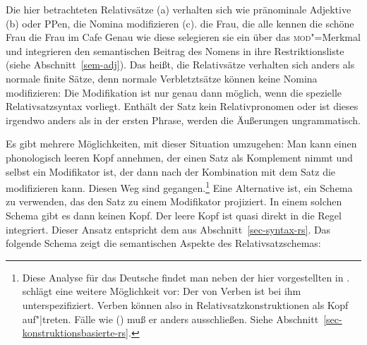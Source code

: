 Die hier betrachteten Relativsätze (a) verhalten sich wie pränominale
Adjektive (b) oder PPen, die Nomina modifizieren (c).
\eal
\ex die Frau, die alle kennen
\ex die schöne Frau
\ex die Frau im Cafe
\zl
Genau wie diese selegieren sie ein \nbar über das \textsc{mod}"=Merkmal und 
integrieren den semantischen Beitrag des Nomens in ihre Restriktionsliste (siehe Abschnitt~\ref{sem-adj}).
Das heißt, die Relativsätze verhalten sich anders als normale finite Sätze,
denn normale Verbletztsätze können keine Nomina modifizieren:
\eal
{}
\zl
Die Modifikation ist nur genau dann möglich, wenn die spezielle Relativsatzsyntax vorliegt.
Enthält der Satz kein Relativpronomen oder ist dieses irgendwo anders als in der ersten
Phrase, werden die Äußerungen ungrammatisch.

Es gibt mehrere Möglichkeiten, mit dieser Situation umzugehen: Man kann
einen phonologisch leeren Kopf annehmen, der einen Satz als Komplement nimmt 
und selbst ein Modifikator ist, der dann nach der Kombination mit dem Satz
die \nbar modifizieren kann. Diesen Weg sind \citet[Kapitel~5]{ps2} gegangen.\footnote{
  Diese Analyse für das Deutsche findet man neben der hier vorgestellten in .
  \citet{Sag97a} schlägt eine weitere Möglichkeit vor: Der \modw von Verben ist
  bei ihm unterspezifiziert. Verben können also in Relativsatzkonstruktionen
  als Kopf auf"|treten. Fälle wie () muß er anders ausschließen. Siehe Abschnitt~\ref{sec-konstruktionsbasierte-rs}.%
}
Eine Alternative ist, ein Schema zu verwenden, das den Satz
zu einem Modifikator projiziert. In einem solchen Schema gibt es dann keinen
Kopf. Der leere Kopf ist quasi direkt in die Regel integriert. Dieser Ansatz entspricht dem aus Abschnitt~\ref{sec-syntax-rs}.
Das folgende
Schema zeigt die semantischen Aspekte des Relativsatzschemas:


